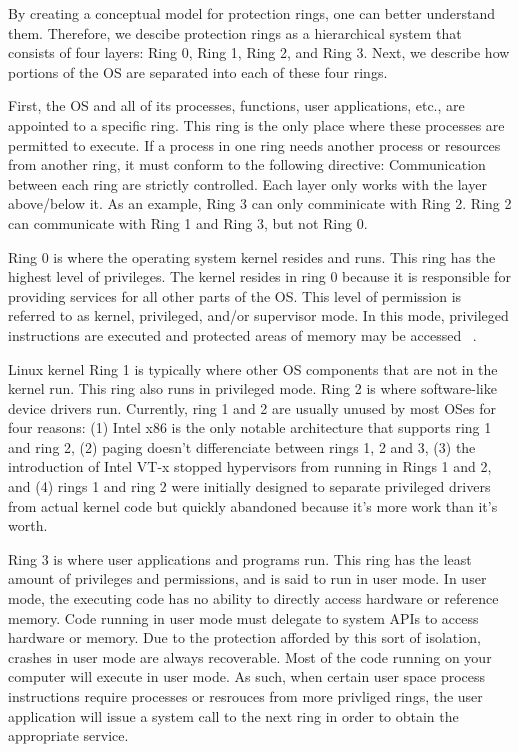 \documentclass{report}
\begin{document}
\begin{spacing}{1.5}
{\large
By creating a conceptual model for protection rings, one can better understand them. Therefore, we descibe protection rings as a hierarchical system that consists of four layers: Ring 0, Ring 1, Ring 2, and Ring 3. Next, we describe how portions of the OS are separated into each of these four rings.
\newline
}

{\large
First, the OS and all of its processes, functions, user applications, etc., are appointed to a specific ring. This ring is the only place where these processes are permitted to execute. If a process in one ring needs another process or resources from another ring, it must conform to the following directive:
\newline
Communication between each ring are strictly controlled. Each layer only works with the layer above/below it. As an example, Ring 3 can only comminicate with Ring 2. Ring 2 can communicate with Ring 1 and Ring 3, but not Ring 0.
\newline
}

{\large
Ring 0 is where the operating system kernel resides and runs. This ring has the highest level of privileges. The kernel resides in ring 0 because it is responsible for providing services for all other parts of the OS. This level of permission is referred to as kernel, privileged, and/or supervisor mode. In this mode, privileged instructions are executed and protected areas of memory may be accessed ~\cite{Wiley2011}.

Linux kernel Ring 1 is typically where other OS components that are not in the kernel run. This ring also runs in privileged mode. Ring 2 is where software-like device drivers run. Currently, ring 1 and 2 are usually unused by most OSes for four reasons: (1) Intel x86 is the only notable architecture that supports ring 1 and ring 2, (2) paging doesn't differenciate between rings 1, 2 and 3, (3) the introduction of Intel VT-x stopped hypervisors from running in Rings 1 and 2, and (4) rings 1 and ring 2 were initially designed to separate privileged drivers from actual kernel code but quickly abandoned because it's more work than it's worth. 

Ring 3 is where user applications and programs run. This ring has the least amount of privileges and permissions, and is said to run in user mode. In user mode, the executing code has no ability to directly access hardware or reference memory. Code running in user mode must delegate to system APIs to access hardware or memory. Due to the protection afforded by this sort of isolation, crashes in user mode are always recoverable. Most of the code running on your computer will execute in user mode. As such, when certain user space process instructions require processes or resrouces from more privliged rings, the user application will issue a system call to the next ring in order to obtain the appropriate service.
\newline
}


\end{spacing}
\end{document}
